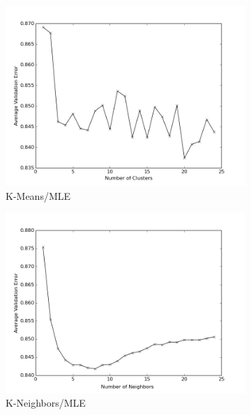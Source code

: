 \documentclass[11pt]{article}
\begin{document}
\begin{figure}[h!]
    \begin{subfigure}[h!]{0.33\textwidth}
        \includegraphics[width=\textwidth]{NL_kMeans_mle.png}
        \caption{K-Means/MLE}
        \label{fig:kmMLE_NL}
    \end{subfigure}%
    \begin{subfigure}[h!]{0.33\textwidth}
        \includegraphics[width=\textwidth]{NL_KN_mle.png}
        \caption{K-Neighbors/MLE}
        \label{fig:knMLE_NL}
    \end{subfigure}
    \begin{subfigure}[h!]{0.33\textwidth}

\end{subfigure}
\end{figure}
\end{document}
